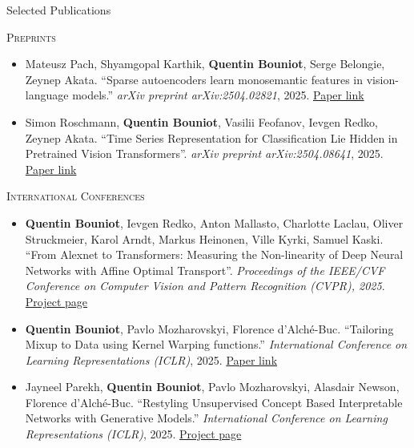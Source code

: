 \documentclass{resume} %
\begin{document}
    \begin{rSection}{Selected Publications}

    \textsc{Preprints}

    \begin{itemize}[label=$\cdot$]
        
        \item Mateusz Pach, Shyamgopal Karthik, \textbf{Quentin Bouniot}, Serge Belongie, Zeynep Akata. ``Sparse autoencoders learn monosemantic features in vision-language models.'' \emph{arXiv preprint arXiv:2504.02821}, 2025. \href{https://arxiv.org/abs/2504.02821}{Paper link}
        \item Simon Roschmann, \textbf{Quentin Bouniot}, Vasilii Feofanov, Ievgen Redko, Zeynep Akata. ``Time Series Representation for Classification Lie Hidden in Pretrained Vision Transformers''. \emph{arXiv preprint arXiv:2504.08641}, 2025. \href{https://arxiv.org/abs/2506.08641}{Paper link}

    \end{itemize}

    \textsc{International Conferences}

    \begin{itemize}[label=$\cdot$]

        \item \textbf{Quentin Bouniot}, Ievgen Redko, Anton Mallasto, Charlotte Laclau, Oliver Struckmeier, Karol Arndt, Markus Heinonen, Ville Kyrki, Samuel Kaski. ``From Alexnet to Transformers: Measuring the Non-linearity of Deep Neural Networks with Affine Optimal Transport''. \emph{Proceedings of the IEEE/CVF Conference on Computer Vision and Pattern Recognition (CVPR), 2025}. \href{https://qbouniot.github.io/affscore_website/}{Project page}
        
        \item \textbf{Quentin Bouniot}, Pavlo Mozharovskyi, Florence d'Alché-Buc. ``Tailoring Mixup to Data using Kernel Warping functions.'' \emph{International Conference on Learning Representations (ICLR)}, 2025. \href{https://arxiv.org/abs/2311.01434}{Paper link}

        \item Jayneel Parekh, \textbf{Quentin Bouniot}, Pavlo Mozharovskyi, Alasdair Newson, Florence d'Alché-Buc. ``Restyling Unsupervised Concept Based Interpretable Networks with Generative Models.'' \emph{International Conference on Learning Representations (ICLR)}, 2025. \href{https://jayneelparekh.github.io/VisCoIN_project_page/}{Project page}


\end{itemize}
\end{rSection}
\end{document}

